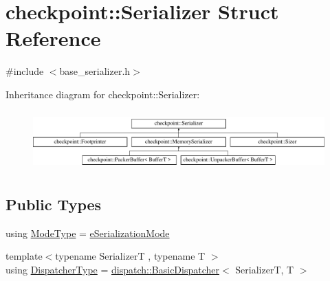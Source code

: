 \hypertarget{structcheckpoint_1_1_serializer}{}\section{checkpoint\+:\+:Serializer Struct Reference}
\label{structcheckpoint_1_1_serializer}


{\ttfamily \#include $<$base\+\_\+serializer.\+h$>$}

Inheritance diagram for checkpoint\+:\+:Serializer\+:\begin{figure}[H]
\begin{center}
\leavevmode
\includegraphics[height=2.314050cm]{structcheckpoint_1_1_serializer}
\end{center}
\end{figure}
\subsection*{Public Types}
\begin{DoxyCompactItemize}
\item 
using \hyperlink{structcheckpoint_1_1_serializer_a4c307e2592dc4224d8a13148109c5764}{Mode\+Type} = \hyperlink{namespacecheckpoint_ae2509499ccd8b1dc48fb535bf8aa3059}{e\+Serialization\+Mode}
\item 
{\footnotesize template$<$typename SerializerT , typename T $>$ }\\using \hyperlink{structcheckpoint_1_1_serializer_ad8effc5884f1ed37b6b4507422f6d72c}{Dispatcher\+Type} = \hyperlink{structcheckpoint_1_1dispatch_1_1_basic_dispatcher}{dispatch\+::\+Basic\+Dispatcher}$<$ SerializerT, T $>$
\end{DoxyCompactItemize}
